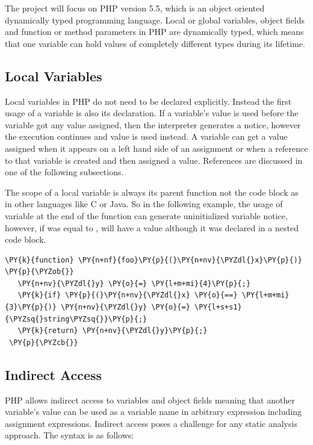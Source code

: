 The project will focus on PHP version 5.5, which is an object 
oriented dynamically typed programming language. Local or global 
variables, object fields and function or method parameters in PHP 
are dynamically typed, which means that one variable can hold 
values of completely different types during its lifetime.

\subsection{Local Variables}
Local variables in PHP do not need to be declared explicitly. 
Instead the first usage of a variable is also its declaration. 
If a variable's value is used before the variable got any 
value assigned, then the interpreter generates a notice, 
however the execution continues and value  is 
used instead. A variable can get a value assigned when it 
appears on a left hand side of an assignment or when a 
reference to that variable is created and then assigned a value. 
References are discussed in one of the following subsections.

The scope of a local variable is always its parent function not the 
code block as in other languages like C or Java. So in the following 
example, the usage of variable  at the end of the function 
can generate uninitialized variable notice, however, if  
was equal to ,  will have a value although it 
was declared in a nested code block.

\begin{Verbatim}[commandchars=\\\{\}]
 \PY{k}{function} \PY{n+nf}{foo}\PY{p}{(}\PY{n+nv}{\PYZdl{}x}\PY{p}{)} \PY{p}{\PYZob{}}
   \PY{n+nv}{\PYZdl{}y} \PY{o}{=} \PY{l+m+mi}{4}\PY{p}{;}    
   \PY{k}{if} \PY{p}{(}\PY{n+nv}{\PYZdl{}x} \PY{o}{==} \PY{l+m+mi}{3}\PY{p}{)} \PY{n+nv}{\PYZdl{}y} \PY{o}{=} \PY{l+s+s1}{\PYZsq{}string\PYZsq{}}\PY{p}{;}
   \PY{k}{return} \PY{n+nv}{\PYZdl{}y}\PY{p}{;}
 \PY{p}{\PYZcb{}}
\end{Verbatim}

\subsection{Indirect Access}
PHP allows indirect access to variables and object fields meaning 
that another variable's value can be used as a variable name in 
arbitrary expression including assignment expressions. 
Indirect access poses a challenge for any static analysis approach. 
The syntax is as follows:

